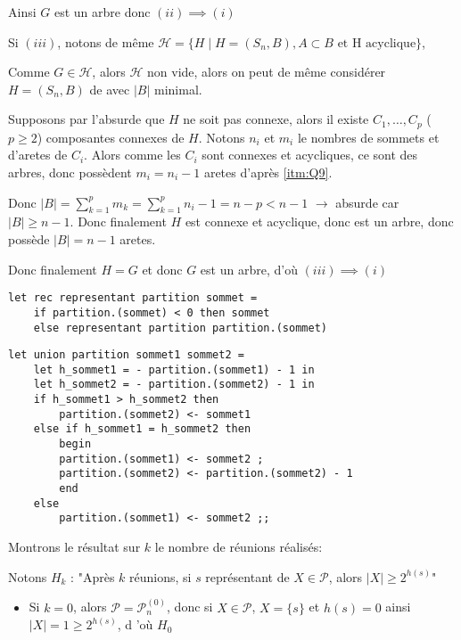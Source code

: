 \documentclass{article}
\begin{document}
\begin{question}
    Ainsi $G$ est un arbre donc $(ii) \implies (i)$

    \vspace{1em}

    Si $(iii)$, notons de même
    $\mathcal{H} = \{H \mid H = (S_n, B),A \subset B \text{ et H acyclique}\}$,

    Comme $G \in \mathcal{H}$, alors $\mathcal{H}$ non vide, alors on peut
    de même considérer $H = (S_n, B)$ de avec $|B|$ minimal.

    Supposons par l'absurde que $H$ ne soit pas connexe, alors il existe $C_1,
    \hdots, C_p$ ($p \geqslant 2$) composantes connexes de $H$. Notons $n_i$
    et $m_i$ le nombres de sommets et d'aretes de $C_i$. Alors comme les $C_i$
    sont connexes et acycliques, ce sont des arbres, donc possèdent $m_i = n_i
    - 1$ aretes d'après \ref{itm:Q9}.

    Donc $|B| = \sum_{k=1}^{p} m_k = \sum_{k=1}^{p} n_i - 1 = n - p < n - 1$
    $\rightarrow$ absurde car $|B| \geqslant n - 1$. Donc finalement $H$ est
    connexe et acyclique, donc est un arbre, donc possède $|B| = n - 1$ aretes.

    Donc finalement $H = G$ et donc $G$ est un arbre, d'où $(iii) \implies (i)$
    
    \item \begin{verbatim}
let rec representant partition sommet =
    if partition.(sommet) < 0 then sommet
    else representant partition partition.(sommet)
    \end{verbatim}

    \item \begin{verbatim}
let union partition sommet1 sommet2 =
    let h_sommet1 = - partition.(sommet1) - 1 in
    let h_sommet2 = - partition.(sommet2) - 1 in
    if h_sommet1 > h_sommet2 then
        partition.(sommet2) <- sommet1
    else if h_sommet1 = h_sommet2 then
        begin
        partition.(sommet1) <- sommet2 ;
        partition.(sommet2) <- partition.(sommet2) - 1 
        end
    else
        partition.(sommet1) <- sommet2 ;;
    \end{verbatim}

    \item \label{itm:Q13} Montrons le résultat sur $k$ le nombre de réunions 
    réalisés:
    
    Notons $H_k$ : "Après $k$ réunions, si $s$ représentant de 
    $X \in \mathscr{P}$, alors $|X| \geq 2^{h(s)}$"
    \begin{itemize}
        \item Si $k = 0$, alors $\mathscr{P} = \mathscr{P}^{(0)}_n$, donc
        si $X \in \mathscr{P}$, $X = \{s\}$ et $h(s) = 0$ ainsi 
        $|X| = 1 \geq 2^{h(s)}$, d 'où ${H}_0$


\end{itemize}
\end{question}
\end{document}
